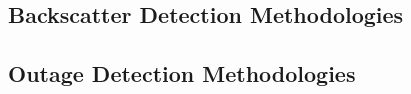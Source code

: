 \documentclass[manuscript,nonacm]{acmart}
\begin{document}



\vspace{0.25em}


\subsection{Backscatter Detection Methodologies}


\subsection{Outage Detection Methodologies}




\end{document}
